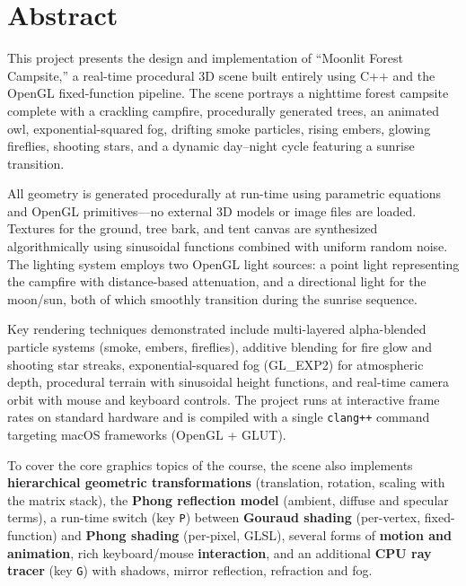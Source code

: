 \documentclass[12pt,a4paper]{report}
\begin{document}
\setcounter{page}{1}

\chapter*{Abstract}

This project presents the design and implementation of ``Moonlit Forest Campsite,'' a real-time procedural 3D scene built entirely using C++ and the OpenGL fixed-function pipeline.
The scene portrays a nighttime forest campsite complete with a crackling campfire, procedurally generated trees, an animated owl, exponential-squared fog, drifting smoke particles, rising embers, glowing fireflies, shooting stars, and a dynamic day--night cycle featuring a sunrise transition.

All geometry is generated procedurally at run-time using parametric equations and OpenGL primitives---no external 3D models or image files are loaded.
Textures for the ground, tree bark, and tent canvas are synthesized algorithmically using sinusoidal functions combined with uniform random noise.
The lighting system employs two OpenGL light sources: a point light representing the campfire with distance-based attenuation, and a directional light for the moon/sun, both of which smoothly transition during the sunrise sequence.

Key rendering techniques demonstrated include multi-layered alpha-blended particle systems (smoke, embers, fireflies), additive blending for fire glow and shooting star streaks, exponential-squared fog (GL\_EXP2) for atmospheric depth, procedural terrain with sinusoidal height functions, and real-time camera orbit with mouse and keyboard controls.
The project runs at interactive frame rates on standard hardware and is compiled with a single \texttt{clang++} command targeting macOS frameworks (OpenGL + GLUT).

To cover the core graphics topics of the course, the scene also implements \textbf{hierarchical geometric transformations} (translation, rotation, scaling with the matrix stack), the \textbf{Phong reflection model} (ambient, diffuse and specular terms), a run-time switch (key \texttt{P}) between \textbf{Gouraud shading} (per-vertex, fixed-function) and \textbf{Phong shading} (per-pixel, GLSL), several forms of \textbf{motion and animation}, rich keyboard/mouse \textbf{interaction}, and an additional \textbf{CPU ray tracer} (key \texttt{G}) with shadows, mirror reflection, refraction and fog.
\end{document}
